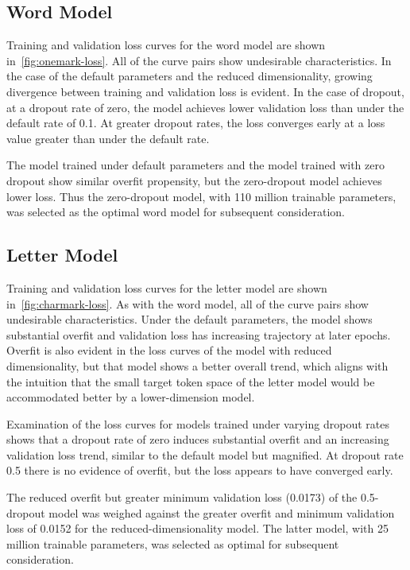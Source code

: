 \documentclass[letterpaper]{article} %
\begin{document}
\begin{NoHyper}
\subsection{Word Model}
\label{subsec:word}

Training and validation loss curves for the word model are shown in~\autoref{fig:onemark-loss}.
All of the curve pairs show undesirable characteristics.
In the case of the default parameters and the reduced dimensionality, growing divergence between training and validation loss is evident.
In the case of dropout, at a dropout rate of zero, the model achieves lower validation loss than under the default rate of 0.1. At greater dropout rates, the loss converges  early at a loss value greater than under the default rate.

The model trained under default parameters and the model trained with zero dropout show similar overfit propensity, but the zero-dropout model achieves lower loss.
Thus the zero-dropout model, with 110 million trainable parameters, was selected as the optimal word model for subsequent consideration.

\subsection{Letter Model}
\label{subsec:letter}

Training and validation loss curves for the letter model are shown in~\autoref{fig:charmark-loss}.
As with the word model, all of the curve pairs show undesirable characteristics.
Under the default parameters, the model shows substantial overfit and validation loss has increasing trajectory at later epochs.
Overfit is also evident in the loss curves of the model with reduced dimensionality, but that model shows a better
overall trend, which aligns with the intuition that the small target token space of the letter model would be
accommodated better by a lower-dimension model.

Examination of the loss curves for models trained under varying dropout rates shows that a dropout rate of zero
induces substantial overfit and an increasing validation loss trend, similar to the default model but magnified.
At dropout rate 0.5 there is no evidence of overfit, but the loss appears to have converged early.

The reduced overfit but greater minimum validation loss (0.0173) of the 0.5-dropout model was weighed against the
greater overfit and minimum validation loss of 0.0152 for the reduced-dimensionality model.
The latter model, with 25 million trainable parameters, was selected as optimal for subsequent consideration.


\end{NoHyper}
\end{document}
